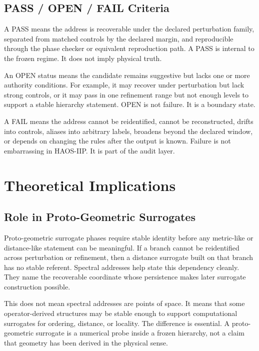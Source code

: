 \documentclass[11pt]{article}
\begin{document}
\subsection{PASS / OPEN / FAIL Criteria}

A \textsc{PASS} means the address is recoverable under the declared perturbation family, separated from matched controls by the declared margin, and reproducible through the phase checker or equivalent reproduction path. A \textsc{PASS} is internal to the frozen regime. It does not imply physical truth.

An \textsc{OPEN} status means the candidate remains suggestive but lacks one or more authority conditions. For example, it may recover under perturbation but lack strong controls, or it may pass in one refinement range but not enough levels to support a stable hierarchy statement. \textsc{OPEN} is not failure. It is a boundary state.

A \textsc{FAIL} means the address cannot be reidentified, cannot be reconstructed, drifts into controls, aliases into arbitrary labels, broadens beyond the declared window, or depends on changing the rules after the output is known. Failure is not embarrassing in HAOS-IIP. It is part of the audit layer.

\section{Theoretical Implications}

\subsection{Role in Proto-Geometric Surrogates}

Proto-geometric surrogate phases require stable identity before any metric-like or distance-like statement can be meaningful. If a branch cannot be reidentified across perturbation or refinement, then a distance surrogate built on that branch has no stable referent. Spectral addresses help state this dependency cleanly. They name the recoverable coordinate whose persistence makes later surrogate construction possible.

This does not mean spectral addresses are points of space. It means that some operator-derived structures may be stable enough to support computational surrogates for ordering, distance, or locality. The difference is essential. A proto-geometric surrogate is a numerical probe inside a frozen hierarchy, not a claim that geometry has been derived in the physical sense.
\end{document}
